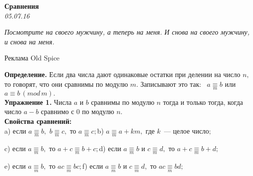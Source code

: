 \begin{center}
\textbf{\Large Сравнения}\\
\textit{05.07.16}
\end{center}

\epigraph{\textit{Посмотрите на своего мужчину, а теперь на меня. И снова на своего мужчину, и снова на меня.}}{Реклама Old Spice}

\textbf{Определение.} Если два числа дают одинаковые остатки при делении на число $n,$ то говорят, что они сравнимы по модулю $m.$ Записывают это так: ~$a\mathop{\equiv}\limits_m b$ или $a\equiv b\,(mod\,m).$\\
\textbf{Упражнение 1.} Числа $a$ и $b$ сравнимы по модулю $n$ тогда и только тогда, когда число $a-b$ сравнимо с $0$ по модулю $n$.\\
\textbf{Свойства сравнений:}\\
a) если $a \mathop{\equiv}\limits_m b ,$ $b \mathop{\equiv}\limits_m c,$ то $a \mathop{\equiv}\limits_m c  ;$\quad  b) $a \mathop{\equiv}\limits_m a + km  ,$ где $k$~--- целое число;

c) если $a \mathop{\equiv}\limits_m b  ,$ то $a + c  \mathop{\equiv}\limits_m b + c  ;$\quad d) если $a \mathop{\equiv}\limits_m b$   и $c \mathop{\equiv}\limits_m d  ,$ то $a + c \mathop{\equiv}\limits_m b + d  ;$

e) если $a \mathop{\equiv}\limits_m b,$   то $ac \mathop{\equiv}\limits_m bc  ;$\quad f) если $a \mathop{\equiv}\limits_m b$ и $c \mathop{\equiv}\limits_m d  ,$ то $ac \mathop{\equiv}\limits_m bd  ;$




